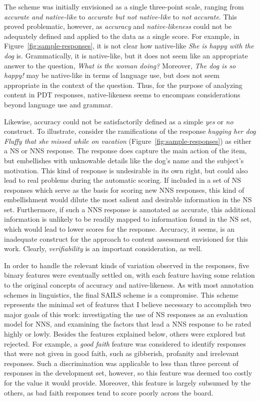 The scheme was initially envisioned as a single three-point scale, ranging from \textit{accurate and native-like} to \textit{accurate but not native-like} to \textit{not accurate}. This proved problematic, however, as \textit{accuracy} and \textit{native-likeness} could not be adequately defined and applied to the data as a single score.
For example, in Figure~\ref{fig:sample-responses}, it is not clear how native-like \textit{She is happy with the dog} is.  Grammatically, it is native-like, but it does not seem like an appropriate answer to the question, \textit{What is the woman doing?} Moreover, \textit{The dog is so happy!} may be native-like in terms of language use, but does not seem appropriate in the context of the question. Thus, for the purpose of analyzing content in PDT responses, native-likeness seems to encompass considerations beyond language use and grammar. 

Likewise, accuracy could not be satisfactorily defined as a simple \textit{yes} or \textit{no} construct. To illustrate, consider the ramifications of the response \textit{hugging her dog Fluffy that she missed while on vacation} (Figure~\ref{fig:sample-responses}) as either a NS or NNS response. The response does capture the main action of the item, but embellishes with unknowable details like the dog's name and the subject's motivation. This kind of response is undesirable in its own right, but could also lead to real problems during the automatic scoring. If included in a set of NS responses which serve as the basis for scoring new NNS responses, this kind of embellishment would dilute the most salient and desirable information in the NS set. Furthermore, if such a NNS response is annotated as accurate, this additional information is unlikely to be readily mapped to information found in the NS set, which would lead to lower scores for the response. Accuracy, it seems, is an inadequate construct for the approach to content assessment envisioned for this work. Clearly, \textit{verifiability} is an important consideration, as well.


In order to handle the relevant kinds of variation observed in the responses, five binary features were eventually settled on, with each feature having some relation to the original concepts of accuracy and native-likeness. As with most annotation schemes in linguistics, the final SAILS scheme is a compromise. This scheme represents the minimal set of features that I believe necessary to accomplish two major goals of this work: investigating the use of NS responses as an evaluation model for NNS, and examining the factors that lead a NNS response to be rated highly or lowly. Besides the features explained below, others were explored but rejected. For example, a \textit{good faith} feature was considered to identify responses that were not given in good faith, such as gibberish, profanity and irrelevant responses. Such a discrimination was applicable to less than three percent of responses in the development set, however, so this feature was deemed too costly for the value it would provide. Moreover, this feature is largely subsumed by the others, as bad faith responses tend to score poorly across the board.

